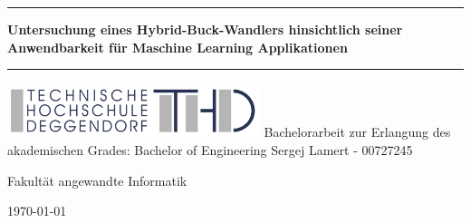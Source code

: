 \thispagestyle{empty} %

\newcommand{\Rule}{\rule{\textwidth}{1mm}}
\begin{center}
    \Rule\vspace{5mm}
    \sffamily\bfseries\Huge
    Untersuchung eines Hybrid-Buck-Wandlers hinsichtlich seiner Anwendbarkeit für Maschine Learning Applikationen
    \vspace{1mm}\Rule
    \vfill  %
    \includegraphics[height=16mm]{Pictures/THD-Logo.pdf}
    \vfill
    \LARGE Bachelorarbeit zur Erlangung des akademischen Grades:
   	Bachelor of Engineering
    \vfill
    \Large Sergej Lamert - 00727245 \par
    Fakultät angewandte Informatik \par
    \vfill
    \today
    
\end{center}